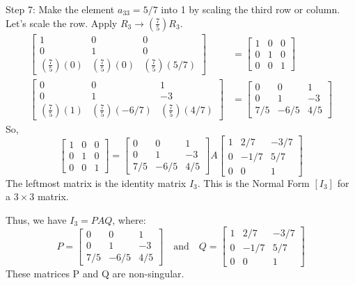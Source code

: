 \documentclass{article}
\begin{document}
Step 7: Make the element $a_{33}=5/7$ into 1 by scaling the third row or column. Let's scale the row.
Apply $R_3 \to (\frac{7}{5})R_3$.
\begin{align*} \begin{bmatrix} 1 & 0 & 0 \\ 0 & 1 & 0 \\ (\frac{7}{5})(0) & (\frac{7}{5})(0) & (\frac{7}{5})(5/7) \end{bmatrix} &= \begin{bmatrix} 1 & 0 & 0 \\ 0 & 1 & 0 \\ 0 & 0 & 1 \end{bmatrix} \\ \begin{bmatrix} 0 & 0 & 1 \\ 0 & 1 & -3 \\ (\frac{7}{5})(1) & (\frac{7}{5})(-6/7) & (\frac{7}{5})(4/7) \end{bmatrix} &= \begin{bmatrix} 0 & 0 & 1 \\ 0 & 1 & -3 \\ 7/5 & -6/5 & 4/5 \end{bmatrix}\end{align*}
So,
\[ \begin{bmatrix} 1 & 0 & 0 \\ 0 & 1 & 0 \\ 0 & 0 & 1 \end{bmatrix} = \begin{bmatrix} 0 & 0 & 1 \\ 0 & 1 & -3 \\ 7/5 & -6/5 & 4/5 \end{bmatrix} A \begin{bmatrix} 1 & 2/7 & -3/7 \\ 0 & -1/7 & 5/7 \\ 0 & 0 & 1 \end{bmatrix} \]
The leftmost matrix is the identity matrix $I_3$. This is the Normal Form $[I_3]$ for a $3 \times 3$ matrix.

Thus, we have $I_3 = PAQ$, where:
\[ P = \begin{bmatrix} 0 & 0 & 1 \\ 0 & 1 & -3 \\ 7/5 & -6/5 & 4/5 \end{bmatrix} \quad \text{and} \quad Q = \begin{bmatrix} 1 & 2/7 & -3/7 \\ 0 & -1/7 & 5/7 \\ 0 & 0 & 1 \end{bmatrix} \]
These matrices P and Q are non-singular.
\end{document}
